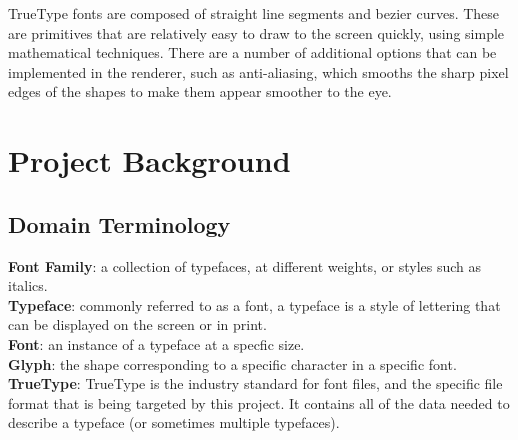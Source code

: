 \documentclass{report}
\begin{document}
TrueType fonts are composed of straight line segments and bezier curves. These
are primitives that are relatively easy to draw to the screen quickly, using
simple mathematical techniques. There are a number of additional options that
can be implemented in the renderer, such as anti-aliasing, which smooths the
sharp pixel edges of the shapes to make them appear smoother to the eye.



\newpage
\section{Project Background}

\subsection{Domain Terminology}
\textbf{Font Family}: a collection of typefaces, at different weights, or styles
such as italics.
\\

\textbf{Typeface}: commonly referred to as a font, a typeface is a style of
lettering that can be displayed on the screen or in print.
\\

\textbf{Font}: an instance of a typeface at a specfic size.
\\

\textbf{Glyph}: the shape corresponding to a specific character in a specific
font.
\\

\textbf{TrueType}: TrueType is the industry standard for font files, and the
specific file format that is being targeted by this project. It contains all of
the data needed to describe a typeface (or sometimes multiple typefaces).
\\
\end{document}
